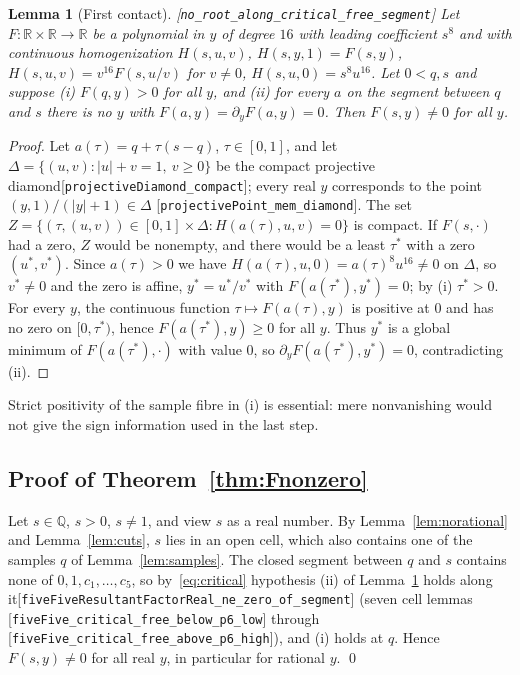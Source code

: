 \documentclass[10pt]{article}
\newtheorem{lemma}[theorem]{Lemma}
\theoremstyle{definition}
\theoremstyle{remark}
\newcommand{\Q}{\mathbb{Q}}
\newcommand{\R}{\mathbb{R}}
\newcommand{\leanref}[1]{{\scriptsize\textup{[\texttt{#1}]}}\allowbreak}
\begin{document}
\begin{lemma}[First contact]\label{lem:first-contact}
\leanref{no\_\allowbreak root\_\allowbreak along\_\allowbreak critical\_\allowbreak free\_\allowbreak segment}
Let $F:\R\times\R\to\R$ be a polynomial in $y$ of degree $16$ with leading
coefficient $s^8$ and with continuous homogenization
$H(s,u,v)$, $H(s,y,1)=F(s,y)$, $H(s,u,v)=v^{16}F(s,u/v)$ for $v\ne0$,
$H(s,u,0)=s^8u^{16}$.  Let $0<q,s$ and suppose (i) $F(q,y)>0$ for all $y$,
and (ii) for every $a$ on the segment between $q$ and $s$ there is no $y$
with $F(a,y)=\partial_yF(a,y)=0$.  Then $F(s,y)\ne0$ for all $y$.
\end{lemma}
\begin{proof}
Let $a(\tau)=q+\tau(s-q)$, $\tau\in[0,1]$, and let $\Delta=\{(u,v):|u|+v=1,\ v\ge0\}$
be the compact projective diamond\leanref{projective\allowbreak Diamond\_\allowbreak compact}; every
real $y$ corresponds to the point $(y,1)/(|y|+1)\in\Delta$
\leanref{projective\allowbreak Point\_\allowbreak mem\_\allowbreak diamond}.  The set
$Z=\{(\tau,(u,v))\in[0,1]\times\Delta:H(a(\tau),u,v)=0\}$ is compact.  If
$F(s,\cdot)$ had a zero, $Z$ would be nonempty, and there would be a least
$\tau^*$ with a zero $(u^*,v^*)$.  Since $a(\tau)>0$ we have
$H(a(\tau),u,0)=a(\tau)^8u^{16}\ne0$ on $\Delta$, so $v^*\ne0$ and the zero is
affine, $y^*=u^*/v^*$ with $F(a(\tau^*),y^*)=0$; by (i) $\tau^*>0$.  For every
$y$, the continuous function $\tau\mapsto F(a(\tau),y)$ is positive at $0$
and has no zero on $[0,\tau^*)$, hence $F(a(\tau^*),y)\ge0$ for all $y$.
Thus $y^*$ is a global minimum of $F(a(\tau^*),\cdot)$ with value $0$, so
$\partial_yF(a(\tau^*),y^*)=0$, contradicting (ii).
\end{proof}
Strict positivity of the sample fibre in (i) is essential: mere
nonvanishing would not give the sign information used in the last step.

\subsection{Proof of Theorem~\ref{thm:Fnonzero}}

Let $s\in\Q$, $s>0$, $s\ne1$, and view $s$ as a real number.  By
Lemma~\ref{lem:norational} and Lemma~\ref{lem:cuts}, $s$ lies in an open cell,
which also contains one of the samples $q$ of Lemma~\ref{lem:samples}.  The
closed segment between $q$ and $s$ contains none of $0,1,c_1,\dots,c_5$, so
by~\eqref{eq:critical} hypothesis (ii) of Lemma~\ref{lem:first-contact} holds
along it\leanref{five\allowbreak Five\allowbreak Resultant\allowbreak Factor\allowbreak Real\_\allowbreak ne\_\allowbreak zero\_\allowbreak of\_\allowbreak segment}
(seven cell lemmas \leanref{five\allowbreak Five\_\allowbreak critical\_\allowbreak free\_\allowbreak below\_\allowbreak p6\_\allowbreak low} through
\leanref{five\allowbreak Five\_\allowbreak critical\_\allowbreak free\_\allowbreak above\_\allowbreak p6\_\allowbreak high}), and (i) holds at $q$.
Hence $F(s,y)\ne0$ for all real $y$, in particular for rational $y$.  \qed
\end{document}
